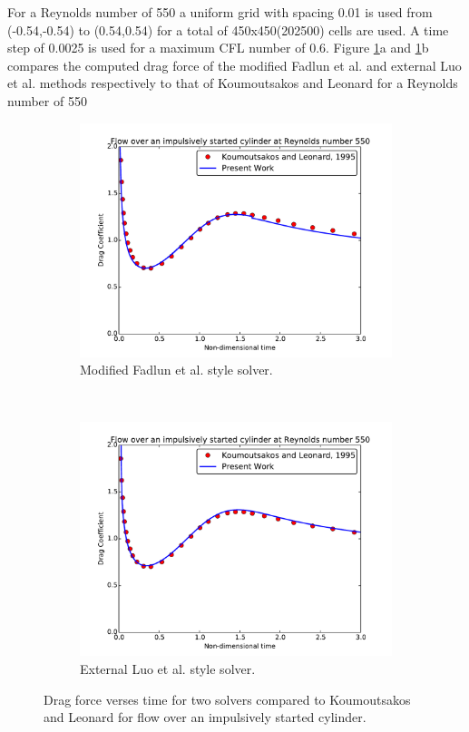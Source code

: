 For a Reynolds number of 550 a uniform grid with spacing 0.01 is used from (-0.54,-0.54) to (0.54,0.54) for a total of 450x450(202500) cells are used. 
A time step of 0.0025 is used for a maximum CFL number of 0.6.
Figure \ref{fig:cy550}a and \ref{fig:cy550}b compares the computed drag force of the modified Fadlun et al. and external Luo et al. methods respectively to that of Koumoutsakos and Leonard for a Reynolds number of 550
\begin{figure}[!htb]
	\centering
	\begin{subfigure}{0.4\textwidth}
		\includegraphics[width=\linewidth]{cy550fadlun}
		\caption{Modified Fadlun et al. style solver.}
	\end{subfigure}
	~
	\begin{subfigure}{0.4\textwidth}
		\includegraphics[width=\linewidth]{cy550luo}
		\caption{External Luo et al. style solver.}
	\end{subfigure}
	\caption{Drag force verses time for two solvers compared to Koumoutsakos and Leonard for flow over an impulsively started cylinder.}
	\label{fig:cy550}
\end{figure}

